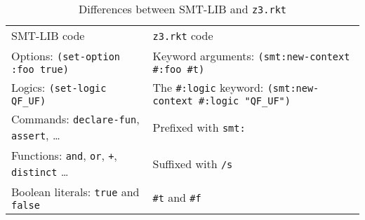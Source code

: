 \begin{table}[hbt]
\caption{Differences between SMT-LIB and \texttt{z3.rkt}}
\label{table:smt-porting}
\begin{center}
\begin{tabularx}{0.91\textwidth}{lX}
\hline\noalign{\smallskip}
SMT-LIB code & \texttt{z3.rkt} code \\
\noalign{\smallskip}
\hline
\noalign{\smallskip}
Options: \texttt{(set-option :foo true)} & Keyword arguments: \newline \texttt{(smt:new-context \#:foo \#t)} \\

Logics: \texttt{(set-logic QF\_UF)} & The \texttt{\#:logic} keyword: \newline \texttt{(smt:new-context \#:logic "QF\_UF")} \\

Commands: \texttt{declare-fun}, \texttt{assert}, \ldots & Prefixed with \texttt{smt:} \\

Functions: \texttt{and}, \texttt{or}, \texttt{+}, \texttt{distinct} \ldots & Suffixed with \texttt{/s} \\

Boolean literals: \texttt{true} and \texttt{false} & \texttt{\#t} and \texttt{\#f} \\

\hline
\end{tabularx}
\end{center}
\end{table}
